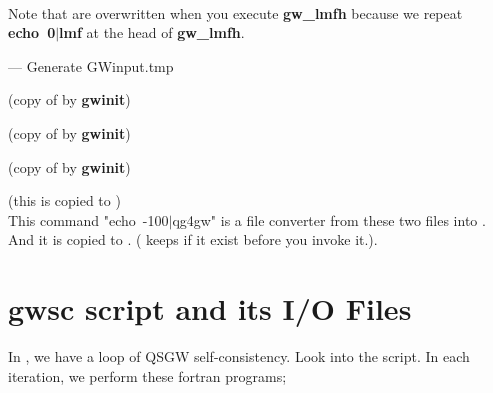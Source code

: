 \ 

Note that  are overwritten when you execute {\bf gw\_lmfh}
because we repeat {\bf echo~0$|$lmf} at the head of {\bf gw\_lmfh}.

 --- Generate GWinput.tmp

\infiles

 (copy of  by {\bf gwinit})

 (copy of  by {\bf gwinit})

  (copy of  by {\bf gwinit})

\outfiles

 (this is copied to )\\

\noindent This command "echo~-100$|$qg4gw" is a file converter 
from these two files into . And it is copied to .
( keeps  if it exist before you invoke it.).

\newpage
\section{gwsc script and its I/O Files}
\label{gwscscript}
In , we have a loop of QSGW self-consistency.
Look into the  script.
In each iteration, we perform these fortran programs;

